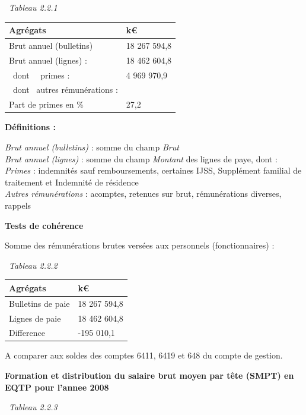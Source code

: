 ~\emph{Tableau 2.2.1}

\begin{longtable}[]{@{}ll@{}}
\toprule
Agrégats & k€\tabularnewline
\midrule
\endhead
Brut annuel (bulletins) & 18 267 594,8\tabularnewline
Brut annuel (lignes) : & 18 462 604,8\tabularnewline
~dont ~~primes : & 4 969 970,9\tabularnewline
~dont ~autres rémunérations : &\tabularnewline
Part de primes en \% & 27,2\tabularnewline
\bottomrule
\end{longtable}

\textbf{Définitions :}

\emph{Brut annuel (bulletins)} : somme du champ \emph{Brut}\\
\emph{Brut annuel (lignes)} : somme du champ \emph{Montant} des lignes
de paye, dont :\\
\emph{Primes} : indemnités sauf remboursements, certaines IJSS,
Supplément familial de traitement et Indemnité de résidence\\
\emph{Autres rémunérations} : acomptes, retenues sur brut, rémunérations
diverses, rappels

\textbf{Tests de cohérence}

Somme des rémunérations brutes versées aux personnels (fonctionnaires) :

~\emph{Tableau 2.2.2}

\begin{longtable}[]{@{}ll@{}}
\toprule
Agrégats & k€\tabularnewline
\midrule
\endhead
Bulletins de paie & 18 267 594,8\tabularnewline
Lignes de paie & 18 462 604,8\tabularnewline
Difference & -195 010,1\tabularnewline
\bottomrule
\end{longtable}

A comparer aux soldes des comptes 6411, 6419 et 648 du compte de
gestion.

\textbf{Formation et distribution du salaire brut moyen par tête (SMPT)
en EQTP pour l'annee 2008 }

~\emph{Tableau 2.2.3}

